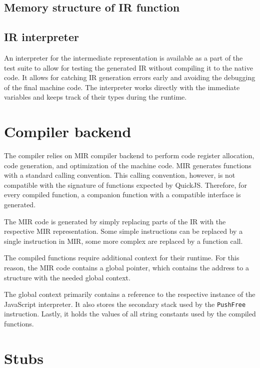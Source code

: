 \subsection{Memory structure of IR function}

\todo{}


\subsection{IR interpreter}

An interpreter for the intermediate representation is available as a part of the test suite to allow for testing the generated IR without compiling it to the native code. It allows for catching IR generation errors early and avoiding the debugging of the final machine code. The interpreter works directly with the immediate variables and keeps track of their types during the runtime.


\section{Compiler backend}

The compiler relies on MIR compiler backend to perform code register allocation, code generation, and optimization of the machine code. MIR generates functions with a standard calling convention. This calling convention, however, is not compatible with the signature of functions expected by QuickJS. Therefore, for every compiled function, a companion function with a compatible interface is generated.

The MIR code is generated by simply replacing parts of the IR with the respective MIR representation. Some simple instructions can be replaced by a single instruction in MIR, some more complex are replaced by a function call.

The compiled functions require additional context for their runtime. For this reason, the MIR code contains a global pointer, which contains the address to a structure with the needed global context.

The global context primarily contains a reference to the respective instance of the JavaScript interpreter. It also stores the secondary stack used by the \texttt{PushFree} instruction. Lastly, it holds the values of all string constants used by the compiled functions.


\section{Stubs}

